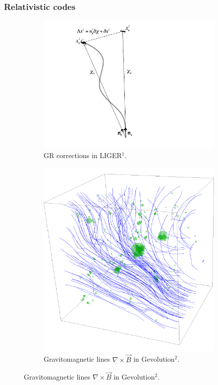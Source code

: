 \documentclass{beamer}
\makeatletter
\newcommand{\mylabel}{%
}
\makeatother
\begin{document}
\begin{frame}[label=ligergevolution]
    \frametitle{Relativistic codes\mylabel}
    \begin{figure}
        \centering
        \begin{subfigure}{0.49\textwidth}
        \includegraphics[width=\textwidth,height=.6\textheight]{images/liger-correction.pdf}
        \caption{GR corrections in LIGER$^1$.}
        \end{subfigure}
        \begin{subfigure}{.49\textwidth}
        \includegraphics[width=\textwidth,height=.6\textheight]{images/gevolution-vector-potential.pdf}
        \caption{Gravitomagnetic lines $\nabla\times \vec B$ in
        Gevolution$^2$.}
        \end{subfigure}
    \end{figure}
\end{frame}
\end{document}
